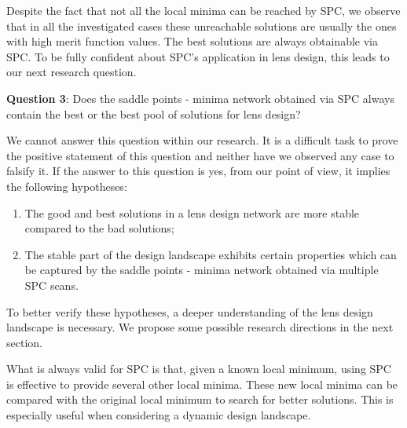 Despite the fact that not all the local minima can be reached by SPC, we observe that in all the investigated cases these unreachable solutions are usually the ones with high merit function values. The best solutions are always obtainable via SPC. To be fully confident about SPC's application in lens design, this leads to our next research question.

\vspace{1em}

\textbf{Question 3}: Does the saddle points - minima network obtained via SPC always contain the best or the best pool of solutions for lens design? 

We cannot answer this question within our research. It is a difficult task to prove the positive statement of this question and neither have we observed any case to falsify it. If the answer to this question is yes, from our point of view, it implies the following hypotheses:

\begin{enumerate}[nosep]
\item The good and best solutions in a lens design network are more stable compared to the bad solutions;
\item The stable part of the design landscape exhibits certain properties which can be captured by the saddle points - minima network obtained via multiple SPC scans.
\end{enumerate}


To better verify these hypotheses, a deeper understanding of the lens design landscape is necessary. We propose some possible research directions in the next section. 

\vspace{1em}

What is always valid for SPC is that, given a known local minimum, using SPC is effective to provide several other local minima. These new local minima can be compared with the original local minimum to search for better solutions. This is especially useful when considering a dynamic design landscape. 

